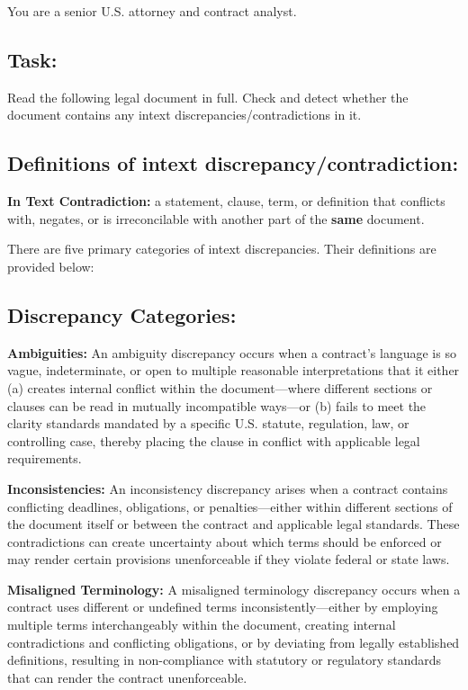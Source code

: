 \documentclass[11pt]{article}
\begin{document}
\begin{tcolorbox}[breakable,colback=lightestgray,colframe=black,title=\textbf{Eval\_3 L1: In-Text Discrepancy Detection Prompt}]
You are a senior U.S. attorney and contract analyst.

\subsection*{\textbf{Task:}}
Read the following legal document in full. Check and detect whether the document contains any intext discrepancies/contradictions in it.

\subsection*{\textbf{Definitions of intext discrepancy/contradiction:}}
\textbf{In Text Contradiction:} a statement, clause, term, or definition that conflicts with, negates, or is irreconcilable with another part of the \textbf{same} document.

There are five primary categories of intext discrepancies. Their definitions are provided below:

\subsection*{\textbf{Discrepancy Categories:}}

\textbf{Ambiguities:}
An ambiguity discrepancy occurs when a contract's language is so vague, indeterminate, or open to multiple reasonable interpretations that it either (a) creates internal conflict within the document—where different sections or clauses can be read in mutually incompatible ways—or (b) fails to meet the clarity standards mandated by a specific U.S. statute, regulation, law, or controlling case, thereby placing the clause in conflict with applicable legal requirements.

\textbf{Inconsistencies:}
An inconsistency discrepancy arises when a contract contains conflicting deadlines, obligations, or penalties—either within different sections of the document itself or between the contract and applicable legal standards. These contradictions can create uncertainty about which terms should be enforced or may render certain provisions unenforceable if they violate federal or state laws.

\textbf{Misaligned Terminology:}
A misaligned terminology discrepancy occurs when a contract uses different or undefined terms inconsistently—either by employing multiple terms interchangeably within the document, creating internal contradictions and conflicting obligations, or by deviating from legally established definitions, resulting in non-compliance with statutory or regulatory standards that can render the contract unenforceable.


\end{tcolorbox}
\end{document}
